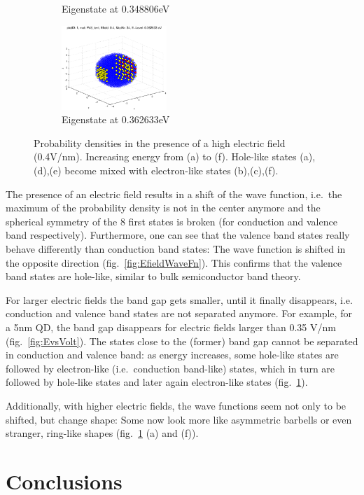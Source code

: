 \begin{figure}
\begin{subfigure}{150px}
		\caption{Eigenstate at 0.348806eV}
	\end{subfigure}
	\begin{subfigure}{150px}
		\includegraphics[width=150px]{Fig/Plots/r25v04Mod34}
		\caption{Eigenstate at 0.362633eV}
	\end{subfigure}
	\caption{Probability densities in the presence of a high electric field (0.4V/nm). Increasing energy from (a) to (f). Hole-like states (a),(d),(e) become mixed with electron-like states (b),(c),(f).}
	\label{fig:HighEfieldWaveFn}
\end{figure}


The presence of an electric field results in a shift of the wave function, i.e.~the maximum of the probability density is not in the center anymore and the spherical symmetry of the 8 first states is broken (for conduction and valence band respectively). Furthermore, one can see that the valence band states really behave differently than conduction band states: The wave function is shifted in the opposite direction (fig.~\ref{fig:EfieldWaveFn}). This confirms that the valence band states are hole-like, similar to bulk semiconductor band theory. 
	
For larger electric fields the band gap gets smaller, until it finally disappears, i.e. conduction and valence band states are not separated anymore. For example, for a 5nm  QD, the band gap disappears for electric fields larger than 0.35 V/nm (fig.~\ref{fig:EvsVolt}). The states close to the (former) band gap cannot be separated in conduction and valence band: as energy increases, some hole-like states are followed by electron-like (i.e.~conduction band-like) states, which in turn are followed by hole-like states and later again electron-like states (fig.~\ref{fig:HighEfieldWaveFn}).
	
Additionally, with higher electric fields, the wave functions seem not only to be shifted, but change shape: Some now look more like asymmetric barbells or even stranger, ring-like shapes (fig.~\ref{fig:HighEfieldWaveFn} (a) and (f)).

\FloatBarrier

\section{Conclusions}

